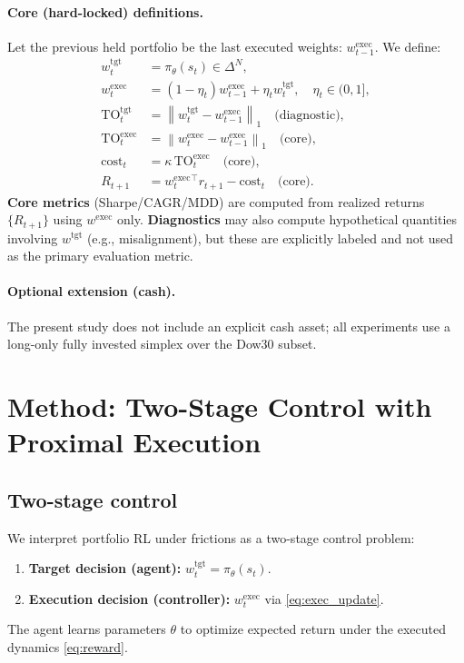 \documentclass[10pt,twocolumn]{article}
\newcommand{\wexec}{w^{\mathrm{exec}}}
\newcommand{\wtgt}{w^{\mathrm{tgt}}}
\newcommand{\TOexec}{\mathrm{TO}^{\mathrm{exec}}}
\newcommand{\TOtgt}{\mathrm{TO}^{\mathrm{tgt}}}
\newcommand{\kappaTC}{\kappa}
\newcommand{\normone}[1]{\left\lVert #1 \right\rVert_1}
\newcommand{\DeltaN}{\Delta^N}
\begin{document}
\paragraph{Core (hard-locked) definitions.}
Let the previous held portfolio be the last executed weights: $\wexec_{t-1}$. We define:
\begin{align}
\wtgt_t &= \pi_\theta(s_t)\in\DeltaN, \label{eq:tgt_policy}\\
\wexec_t &= (1-\eta_t)\wexec_{t-1} + \eta_t \wtgt_t,\quad \eta_t\in(0,1], \label{eq:exec_update}\\
\TOtgt_t &= \normone{\wtgt_t - \wexec_{t-1}}\quad\text{(diagnostic)}, \label{eq:turnover_tgt}\\
\TOexec_t &= \normone{\wexec_t - \wexec_{t-1}}\quad\text{(core)}, \label{eq:turnover_exec}\\
\mathrm{cost}_{t} &= \kappaTC \, \TOexec_t \quad\text{(core)}, \label{eq:cost_exec}\\
R_{t+1} &= \wexec_t^\top r_{t+1} - \mathrm{cost}_t \quad\text{(core)}.\label{eq:reward}
\end{align}
\textbf{Core metrics} (Sharpe/CAGR/MDD) are computed from realized returns $\{R_{t+1}\}$ using $\wexec$ only. \textbf{Diagnostics} may also compute hypothetical quantities involving $\wtgt$ (e.g., misalignment), but these are explicitly labeled and not used as the primary evaluation metric.

\paragraph{Optional extension (cash).}
The present study does not include an explicit cash asset; all experiments use a long-only fully invested simplex over the Dow30 subset.

\section{Method: Two-Stage Control with Proximal Execution}
\subsection{Two-stage control}
We interpret portfolio RL under frictions as a two-stage control problem:
\begin{enumerate}[leftmargin=*,itemsep=1pt]
\item \textbf{Target decision (agent):} $\wtgt_t=\pi_\theta(s_t)$.
\item \textbf{Execution decision (controller):} $\wexec_t$ via \eqref{eq:exec_update}.
\end{enumerate}
The agent learns parameters $\theta$ to optimize expected return under the executed dynamics \eqref{eq:reward}.
\end{document}
